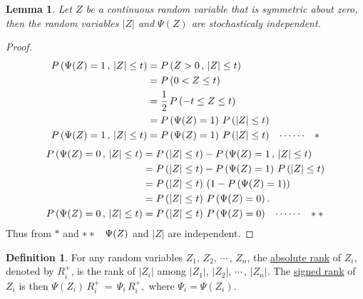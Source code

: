 \documentclass[12pt,a4paper]{report}
\theoremstyle{definition}
\newtheorem{defn}[thm]{Definition}
\theoremstyle{plain}
\newtheorem{lem}[thm]{Lemma}
\begin{document}
\begin{lem}
Let $Z$ be a continuous random variable that is symmetric about zero, then the random variables $|Z|$ and $\Psi(Z)$ are stochasticaly independent.
\end{lem}

\begin{proof}
\begin{align*}
P\left(\Psi(Z) = 1\, , \, |Z| \leq t\right) &  = P\left(Z>0\, , \, |Z| \leq t\right)\\
& = P\left(0 < Z \leq t\right)\\
& = \frac{1}{2}\, P\left(-t \leq Z \leq t\right)\\
& = P\left(\Psi(Z) = 1\right)\, P\left(|Z|\leq t\right)\\
P\left(\Psi(Z) = 1\, , \, |Z| \leq t\right) &  = P\left(\Psi(Z) = 1\right)\, P\left(|Z|\leq t\right)\hspace{0.3cm}\cdots\cdots\hspace{0.3cm}*
\end{align*}
\begin{align*}
P\left(\Psi(Z) = 0\, , \, |Z| \leq t\right) & = P\left(|Z|\leq t\right) - P\left(\Psi(Z) = 1\, , \, |Z|\leq t\right)\\
 & = P\left(|Z|\leq t\right) - P\left(\Psi(Z) = 1\right)\, P\left(|Z| \leq t\right)\\
 & = P\left(|Z|\leq t\right)\, \left(1 - P\left(\Psi(Z) = 1\right)\right)\\
 & = P\left(|Z|\leq t\right)\, P\left(\Psi(Z) = 0\right).\\
 P\left(\Psi(Z) = 0\, , \, |Z| \leq t\right) & = P\left(|Z|\leq t\right)\, P\left(\Psi(Z) = 0\right)\hspace{0.3cm}\cdots\cdots\hspace{0.3cm} **
\end{align*}
Thus from $*$ and $**\hspace{0.3cm} \Psi(Z)$ and $|Z|$ are independent.
\end{proof}

\begin{defn}
For any random variables $Z_1, \, Z_2, \, \cdots\, , \, Z_n$, the  \underline{absolute rank} of $Z_i$, denoted by $R^+_i$, is the rank of $|Z_i|$ among  $|Z_1|, \, |Z_2|, \, \cdots\, , \, |Z_n|$. The \underline{signed rank} of $Z_i$ is then $\Psi(Z_i)\, R^+_i \, = \, \Psi_i\, R^+_i, $ where $\Psi_i = \Psi(Z_i)$.\\
\end{defn}
\end{document}
